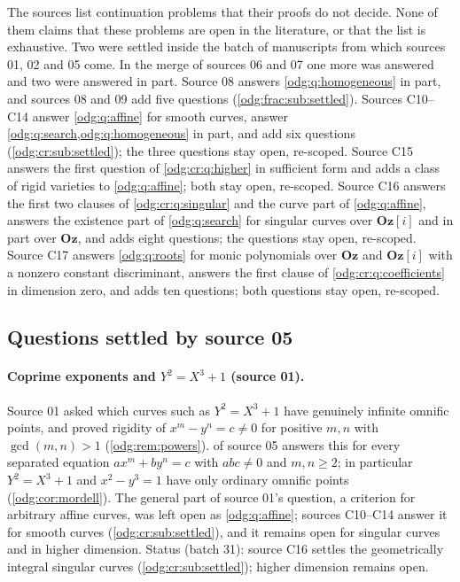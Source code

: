 \documentclass[11pt,oneside]{article}
\numberwithin{equation}{section}
\theoremstyle{definition}
\theoremstyle{remark}
\newcommand{\Oz}{\mathbf{Oz}}
\newcommand{\Og}{\Oz[i]}
\begin{document}
The sources list continuation problems that their proofs do not decide. None
of them claims that these problems are open in the literature, or that the
list is exhaustive. Two were settled inside the batch of manuscripts from
which sources 01, 02 and 05 come. In the merge of sources 06 and 07 one more
was answered and two were answered in part. Source 08 answers
\cref{odg:q:homogeneous} in part, and sources 08 and 09 add five questions
(\cref{odg:frac:sub:settled}). Sources C10--C14 answer \cref{odg:q:affine} for
smooth curves, answer \cref{odg:q:search,odg:q:homogeneous} in part, and add six
questions (\cref{odg:cr:sub:settled}); the three questions stay open, re-scoped.
Source C15 answers the first question of \cref{odg:cr:q:higher} in sufficient form and
adds a class of rigid varieties to \cref{odg:q:affine}; both stay open, re-scoped.
Source C16 answers the first two clauses of \cref{odg:cr:q:singular} and the curve part of
\cref{odg:q:affine}, answers the existence part of \cref{odg:q:search} for singular curves
over $\Og$ and in part over $\Oz$, and adds eight questions; the questions stay open,
re-scoped.
Source C17 answers \cref{odg:q:roots} for monic polynomials over $\Oz$ and $\Og$ with a
nonzero constant discriminant, answers the first clause of \cref{odg:cr:q:coefficients} in
dimension zero, and adds ten questions; both questions stay open, re-scoped.

\subsection{Questions settled by source 05}\label{odg:sub:settled}

\paragraph{Coprime exponents and $Y^2=X^3+1$ (source 01).} Source 01 asked
which curves such as $Y^2=X^3+1$ have genuinely infinite omnific points, and
proved rigidity of $x^m-y^n=c\ne0$ for positive $m,n$ with $\gcd(m,n)>1$
(\cref{odg:rem:powers}).  of source 05 answers this
for every separated equation $ax^m+by^n=c$ with $abc\ne0$ and $m,n\ge2$; in
particular $Y^2=X^3+1$ and $x^2-y^3=1$ have only ordinary omnific points
(\cref{odg:cor:mordell}). The general part of source 01's question, a
criterion for arbitrary affine curves, was left open as \cref{odg:q:affine};
sources C10--C14 answer it for smooth curves (\cref{odg:cr:sub:settled}), and it
remains open for singular curves and in higher dimension. Status (batch 31): source
C16 settles the geometrically integral singular curves (\cref{odg:cr:sub:settled}); higher
dimension remains open.
\end{document}
